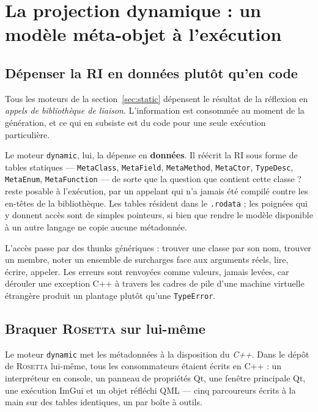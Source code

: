 \documentclass[11pt,a4paper]{article}
\newcommand{\rosetta}{\textsc{Rosetta}}
\newcommand{\code}[1]{\texttt{\small #1}}
\begin{document}
\section{La projection dynamique : un modèle méta-objet à l'exécution}
\label{sec:dynamic}

\subsection{Dépenser la RI en données plutôt qu'en code}

Tous les moteurs de la section~\ref{sec:static} dépensent le résultat de la
réflexion en \emph{appels de bibliothèque de liaison}. L'information est
consommée au moment de la génération, et ce qui en subsiste est du code pour une
seule exécution particulière.

Le moteur \code{dynamic}, lui, la dépense en \textbf{données}. Il réécrit la RI
sous forme de tables statiques --- \code{MetaClass}, \code{MetaField},
\code{MetaMethod}, \code{MetaCtor}, \code{TypeDesc}, \code{MetaEnum},
\code{MetaFunction} --- de sorte que la question \og que contient cette classe ? \fg{}
reste posable à l'exécution, par un appelant qui n'a jamais été compilé contre
les en-têtes de la bibliothèque. Les tables résident dans le \code{.rodata} ; les
poignées qui y donnent accès sont de simples pointeurs, si bien que rendre le
modèle disponible à un autre langage ne copie aucune métadonnée.

L'accès passe par des thunks génériques : trouver une classe par son nom, trouver
un membre, noter un ensemble de surcharges face aux arguments réels, lire,
écrire, appeler. Les erreurs sont renvoyées comme valeurs, jamais levées, car
dérouler une exception C++ à travers les cadres de pile d'une machine virtuelle
étrangère produit un plantage plutôt qu'une \code{TypeError}.

\subsection{Braquer \rosetta{} sur lui-même}

Le moteur \code{dynamic} met les métadonnées à la disposition du \emph{C++}. Dans
le dépôt de \rosetta{} lui-même, tous les consommateurs étaient écrits en C++ :
un interpréteur en console, un panneau de propriétés Qt, une fenêtre principale
Qt, une exécution ImGui et un objet réfléchi QML --- cinq parcoureurs écrits à la
main sur des tables identiques, un par boîte à outils.
\end{document}
